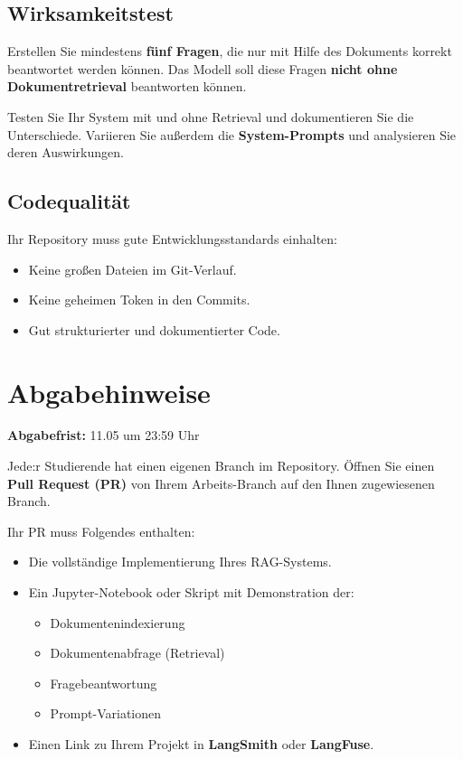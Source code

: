 \documentclass[12pt]{article}
\begin{document}
\subsection*{Wirksamkeitstest}
Erstellen Sie mindestens \textbf{fünf Fragen}, die nur mit Hilfe des Dokuments korrekt beantwortet werden können. Das Modell soll diese Fragen \textbf{nicht ohne Dokumentretrieval} beantworten können.

Testen Sie Ihr System mit und ohne Retrieval und dokumentieren Sie die Unterschiede. Variieren Sie außerdem die \textbf{System-Prompts} und analysieren Sie deren Auswirkungen.

\subsection*{Codequalität}
Ihr Repository muss gute Entwicklungsstandards einhalten:
\begin{itemize}[noitemsep]
  \item Keine großen Dateien im Git-Verlauf.
  \item Keine geheimen Token in den Commits.
  \item Gut strukturierter und dokumentierter Code.
\end{itemize}

\section*{Abgabehinweise}

\textcolor{linkblue}{\textbf{Abgabefrist:} 11.05 um 23:59 Uhr}

Jede:r Studierende hat einen eigenen Branch im Repository. Öffnen Sie einen \textcolor{linkblue}{\textbf{Pull Request (PR)}} von Ihrem Arbeits-Branch auf den Ihnen zugewiesenen Branch.

Ihr PR muss Folgendes enthalten:
\begin{itemize}[noitemsep]
  \item Die vollständige Implementierung Ihres RAG-Systems.
  \item Ein Jupyter-Notebook oder Skript mit Demonstration der:
    \begin{itemize}[noitemsep]
      \item Dokumentenindexierung
      \item Dokumentenabfrage (Retrieval)
      \item Fragebeantwortung
      \item Prompt-Variationen
    \end{itemize}
  \item Einen Link zu Ihrem Projekt in \textbf{LangSmith} oder \textbf{LangFuse}.
\end{itemize}
\end{document}
